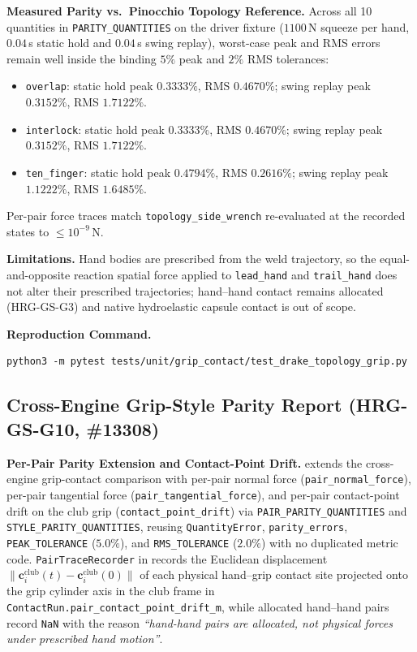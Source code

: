 \documentclass[11pt,a4paper]{article}
\begin{document}
\textbf{Measured Parity vs.\ Pinocchio Topology Reference.} Across all 10 quantities in \texttt{PARITY\_QUANTITIES} on the driver fixture
($1100$\,N squeeze per hand, $0.04$\,s static hold and $0.04$\,s swing replay), worst-case peak and RMS errors remain well inside the binding
$5\%$ peak and $2\%$ RMS tolerances:
\begin{itemize}[leftmargin=*,noitemsep]
\item \texttt{overlap}: static hold peak $0.3333\%$, RMS $0.4670\%$; swing replay peak $0.3152\%$, RMS $1.7122\%$.
\item \texttt{interlock}: static hold peak $0.3333\%$, RMS $0.4670\%$; swing replay peak $0.3152\%$, RMS $1.7122\%$.
\item \texttt{ten\_finger}: static hold peak $0.4794\%$, RMS $0.2616\%$; swing replay peak $1.1222\%$, RMS $1.6485\%$.
\end{itemize}
Per-pair force traces match \texttt{topology\_side\_wrench} re-evaluated at the recorded states to $\le 10^{-9}$\,N.

\textbf{Limitations.} Hand bodies are prescribed from the weld trajectory, so the equal-and-opposite reaction spatial force applied to
\texttt{lead\_hand} and \texttt{trail\_hand} does not alter their prescribed trajectories; hand--hand contact remains allocated (HRG-GS-G3)
and native hydroelastic capsule contact is out of scope.

\textbf{Reproduction Command.}
\begin{verbatim}
python3 -m pytest tests/unit/grip_contact/test_drake_topology_grip.py
\end{verbatim}

\subsection{Cross-Engine Grip-Style Parity Report (HRG-GS-G10, \#13308)}
\textbf{Per-Pair Parity Extension and Contact-Point Drift.}  extends the cross-engine grip-contact comparison with per-pair normal force (\texttt{pair\_normal\_force}), per-pair tangential force (\texttt{pair\_tangential\_force}), and per-pair contact-point drift on the club grip (\texttt{contact\_point\_drift}) via \texttt{PAIR\_PARITY\_QUANTITIES} and \texttt{STYLE\_PARITY\_QUANTITIES}, reusing \texttt{QuantityError}, \texttt{parity\_errors}, \texttt{PEAK\_TOLERANCE} ($5.0\%$), and \texttt{RMS\_TOLERANCE} ($2.0\%$) with no duplicated metric code. \texttt{PairTraceRecorder} in  records the Euclidean displacement $\|\mathbf{c}_i^{\mathrm{club}}(t) - \mathbf{c}_i^{\mathrm{club}}(0)\|$ of each physical hand--grip contact site projected onto the grip cylinder axis in the club frame in \texttt{ContactRun.pair\_contact\_point\_drift\_m}, while allocated hand--hand pairs record \texttt{NaN} with the reason \textit{``hand-hand pairs are allocated, not physical forces under prescribed hand motion''}.
\end{document}
